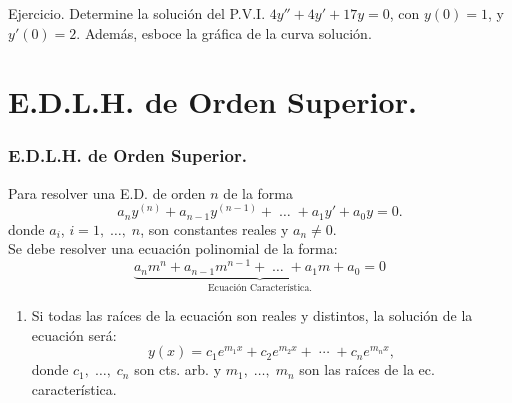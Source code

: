 \documentclass{beamer}
\begin{document}
\begin{frame}[t]
	\begin{alertblock}{Ejercicio.}
		Determine la solución del P.V.I. \(4y'' +4y' +17y=0\), con \(y(0) =1\), y \(y'(0) =2\). Además, esboce la gráfica de la curva solución.
	\end{alertblock}
\end{frame}
\begin{frame}[t]
\end{frame}

\section{E.D.L.H. de Orden Superior.} %
\begin{frame}[t]
	\frametitle{E.D.L.H. de Orden Superior.}
	\begin{block}{}
		Para resolver una E.D. de orden \(n\) de la forma
		\[
			a_ny^{(n)} +a_{n-1} y^{(n-1)} + \;\ldots\; + a_1y' +a_0y =0.
		\]
		donde \(a_i\), \(i=1, \;\ldots,\; n\), son constantes reales y \(a_n \ne 0\). \\[2mm]
		Se debe resolver una ecuación polinomial de la forma:
		\[
			\underbrace{a_nm^n+a_{n-1} m^{n-1} + \;\ldots\; + a_1m+a_0=0} _\text{Ecuación Característica.}
		\]
		\begin{enumerate}
			\item Si todas las raíces de la ecuación son reales y distintos, la solución de la ecuación será:
				\[
					y(x) = c_1e^{m_1x} + c_2e^{m_2x} + \;\cdots\; + c_ne^{m_nx},
				\]
				donde \(c_1, \;\ldots,\; c_n\) son cts. arb. y \(m_1, \;\ldots,\; m_n\) son las raíces de la ec. característica.
		\end{enumerate}
	\end{block}
\end{frame}
\end{document}
